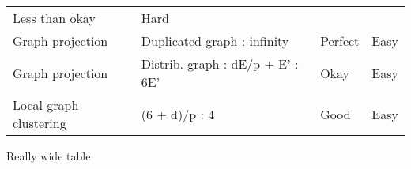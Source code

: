 \documentclass[10pt,oneside]{memoir}
\begin{document}
\begin{longtable}[]{@{}llll@{}}
\begin{minipage}[t]{0.13\columnwidth}
Less than okay\strut
\end{minipage} & \begin{minipage}[t]{0.13\columnwidth}\raggedright
Hard\strut
\end{minipage}\tabularnewline
\begin{minipage}[t]{0.28\columnwidth}\raggedright
Graph projection\strut
\end{minipage} & \begin{minipage}[t]{0.35\columnwidth}\raggedright
Duplicated graph : infinity\strut
\end{minipage} & \begin{minipage}[t]{0.13\columnwidth}\raggedright
Perfect\strut
\end{minipage} & \begin{minipage}[t]{0.13\columnwidth}\raggedright
Easy\strut
\end{minipage}\tabularnewline
\begin{minipage}[t]{0.28\columnwidth}\raggedright
Graph projection\strut
\end{minipage} & \begin{minipage}[t]{0.35\columnwidth}\raggedright
Distrib. graph : dE/p + E' : 6E'\strut
\end{minipage} & \begin{minipage}[t]{0.13\columnwidth}\raggedright
Okay\strut
\end{minipage} & \begin{minipage}[t]{0.13\columnwidth}\raggedright
Easy\strut
\end{minipage}\tabularnewline
\begin{minipage}[t]{0.28\columnwidth}\raggedright
Local graph clustering\strut
\end{minipage} & \begin{minipage}[t]{0.35\columnwidth}\raggedright
(6 + d)/p : 4\strut
\end{minipage} & \begin{minipage}[t]{0.13\columnwidth}\raggedright
Good\strut
\end{minipage} & \begin{minipage}[t]{0.13\columnwidth}\raggedright
Easy\strut
\end{minipage}\tabularnewline
\bottomrule
\end{longtable}

Really wide table
\end{document}

